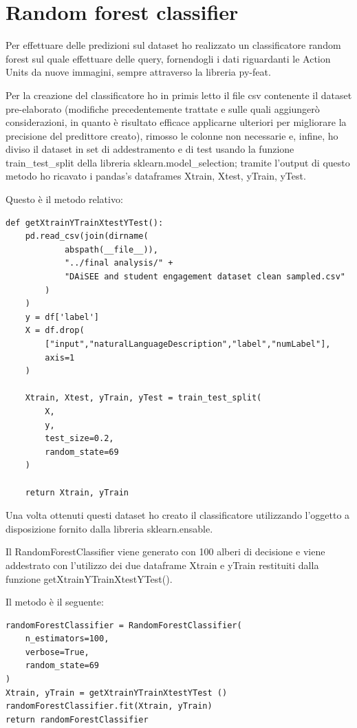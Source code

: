 \section{Random forest classifier}
Per effettuare delle predizioni sul dataset ho realizzato un classificatore random forest sul quale effettuare delle query, fornendogli i dati riguardanti le Action Units da nuove immagini, sempre attraverso la libreria py-feat.

Per la creazione del classificatore ho in primis letto il file csv contenente il dataset pre-elaborato (modifiche precedentemente trattate e sulle quali aggiungerò considerazioni, in quanto è risultato efficace applicarne ulteriori per migliorare la precisione del predittore creato), rimosso le colonne non necessarie e, infine, ho diviso il dataset in set di addestramento e di test usando la funzione train\_test\_split della libreria sklearn.model\_selection; tramite l’output di questo metodo ho ricavato i pandas’s dataframes Xtrain, Xtest, yTrain, yTest.

Questo è il metodo relativo:
\begin{verbatim}
def getXtrainYTrainXtestYTest():
    pd.read_csv(join(dirname(
            abspath(__file__)), 
            "../final analysis/" + 
            "DAiSEE and student engagement dataset clean sampled.csv"
        )
    )
    y = df['label']
    X = df.drop(
        ["input","naturalLanguageDescription","label","numLabel"], 
        axis=1
    )
    
    Xtrain, Xtest, yTrain, yTest = train_test_split(
        X, 
        y, 
        test_size=0.2, 
        random_state=69
    )

    return Xtrain, yTrain 
\end{verbatim}
Una volta ottenuti questi dataset ho creato il classificatore utilizzando l’oggetto a disposizione fornito dalla libreria sklearn.ensable.

Il RandomForestClassifier viene generato con 100 alberi di decisione e viene addestrato con l’utilizzo dei due dataframe Xtrain e yTrain restituiti dalla funzione getXtrainYTrainXtestYTest().

Il metodo è il seguente:
\begin{verbatim}
randomForestClassifier = RandomForestClassifier(
    n_estimators=100, 
    verbose=True, 
    random_state=69
)
Xtrain, yTrain = getXtrainYTrainXtestYTest ()
randomForestClassifier.fit(Xtrain, yTrain)
return randomForestClassifier
\end{verbatim}

